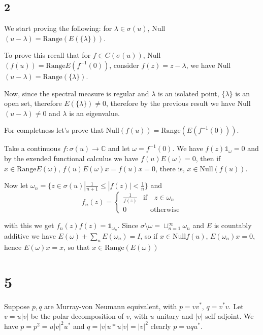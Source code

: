 \documentclass{article}
\begin{document}
\subsection*{2}

We start proving the following: for $\lambda\in \sigma(u)$, Null$(u-\lambda)=
\text{Range}(E(\{\lambda\}))$. 

To prove this recall that for $f\in C(\sigma(u))$, Null$(f(u))=\text{Range}
E(f^{-1}(0))$, consider $f(z)=z-\lambda$, we have Null$(u-\lambda)=\text{Range}
(\{\lambda\})$. 

Now, since the spectral measure is regular and $\lambda$ is an isolated point, 
$\{\lambda\}$ is an open set, therefore $E(\{\lambda\})\neq 0$, therefore by
the previous result we have Null$(u-\lambda)\neq 0$ and $\lambda$ is an eigenvalue.


For completness let's prove that Null$(f(u))=\text{Range}(E(f^{-1}(0)))$. 

Take a continuous $f:\sigma(u)\to \mathbb{C}$ and let $\omega=f^{-1}(0)$. 
We have $f(z)\mathds{1}_{\omega}=0$ and by the exended functional calculus we 
have $f(u)E(\omega)=0$, then if $x\in\text{Range}E(\omega)$, $f(u)E(\omega)x=
f(u)x=0$, there is, $x\in\text{Null}(f(u))$. 

Now let $\omega_n=\{z\in \sigma(u)|\frac{1}{n+1}\leq|f(z)|< \frac{1}{n}\}$
and \[f_n(z)=
\begin{cases}
    \frac{1}{f(z)} & \text{if}\quad z\in \omega_n \\
    0 & \quad \text{otherwise}
\end{cases}\]

with this we get $f_n(z)f(z)=\mathds{1}_{\omega_n}$. Since $\sigma\setminus
\omega=\sqcup_{n=1}^{\infty}\omega_n$ and $E$ is countably additive we have
$E(\omega)+\sum_n E(\omega_n)=I$, so if $x\in \text{Null}f(u)$, $E(\omega_n)x
=0$, hence $E(\omega)x=x$, so that $x\in \text{Range}(E(\omega))$








\section*{5}

 \quad\quad   Suppose $p,q$ are Murray-von Neumann equivalent, with $p=vv^\ast$, $q=v^\ast v$. Let $v=u|v|$ be the polar
decomposition of $v$, with $u$ unitary and $|v|$ self adjoint. We have $p=p^2=u|v|^2u^\ast$ 
and $q=|v|u\ast u |v|=|v|^2$
clearly $p=uqu^\ast$.
\end{document}
